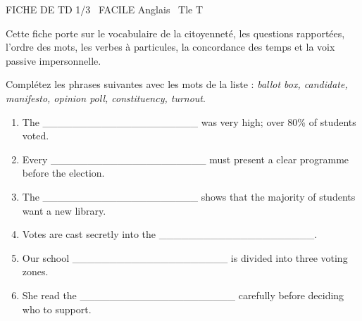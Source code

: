 \documentclass[11pt]{article}
\begin{document}
\begin{tcolorbox}[enhanced,colback=popink,colframe=popink,arc=10pt,boxrule=0pt,left=12pt,right=12pt,top=9pt,bottom=9pt]
{\color{white}\popxbold\small FICHE DE TD 1/3 \textbullet\ FACILE \hfill Anglais \textbullet\ Tle T\par}
\end{tcolorbox}
\vspace{4pt}
Cette fiche porte sur le vocabulaire de la citoyenneté, les questions rapportées, l'ordre des mots, les verbes à particules, la concordance des temps et la voix passive impersonnelle.

\begin{exercice}
Complétez les phrases suivantes avec les mots de la liste : \textit{ballot box, candidate, manifesto, opinion poll, constituency, turnout}.
\begin{enumerate}
    \item The \_\_\_\_\_\_\_\_\_\_\_\_\_\_\_\_\_\_\_\_\_ was very high; over 80\% of students voted.
    \item Every \_\_\_\_\_\_\_\_\_\_\_\_\_\_\_\_\_\_\_\_\_ must present a clear programme before the election.
    \item The \_\_\_\_\_\_\_\_\_\_\_\_\_\_\_\_\_\_\_\_\_ shows that the majority of students want a new library.
    \item Votes are cast secretly into the \_\_\_\_\_\_\_\_\_\_\_\_\_\_\_\_\_\_\_\_\_.
    \item Our school \_\_\_\_\_\_\_\_\_\_\_\_\_\_\_\_\_\_\_\_\_ is divided into three voting zones.
    \item She read the \_\_\_\_\_\_\_\_\_\_\_\_\_\_\_\_\_\_\_\_\_ carefully before deciding who to support.
\end{enumerate}
\end{exercice}
\end{document}
